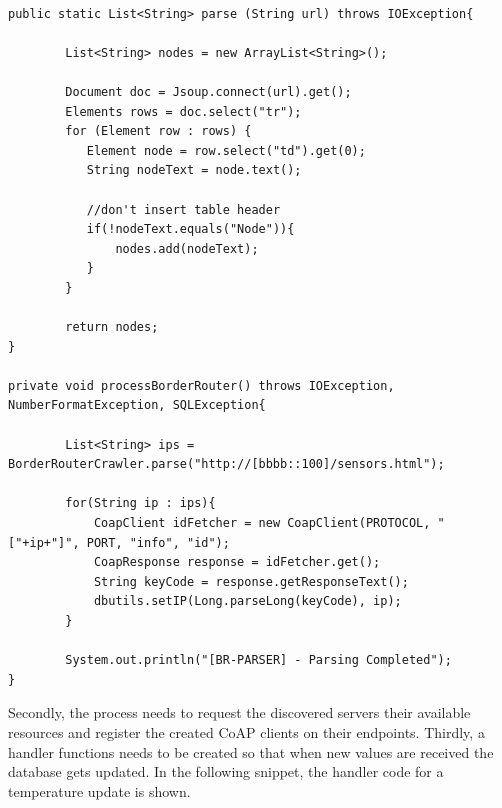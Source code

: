 \begin{lstlisting}[caption={CoAP Client Device Discovery}]

public static List<String> parse (String url) throws IOException{
		
		List<String> nodes = new ArrayList<String>();
		
		Document doc = Jsoup.connect(url).get();
		Elements rows = doc.select("tr");
		for (Element row : rows) {
		   Element node = row.select("td").get(0);
		   String nodeText = node.text();
		   
		   //don't insert table header
		   if(!nodeText.equals("Node")){
			   nodes.add(nodeText);
		   }
		}
		
		return nodes;
}

private void processBorderRouter() throws IOException, NumberFormatException, SQLException{

		List<String> ips = BorderRouterCrawler.parse("http://[bbbb::100]/sensors.html");
		
		for(String ip : ips){
			CoapClient idFetcher = new CoapClient(PROTOCOL, "["+ip+"]", PORT, "info", "id");
			CoapResponse response = idFetcher.get();
			String keyCode = response.getResponseText();
			dbutils.setIP(Long.parseLong(keyCode), ip);
		}
		
		System.out.println("[BR-PARSER] - Parsing Completed");
}

\end{lstlisting}

Secondly, the process needs to request the discovered servers their available resources and register the created \gls{CoAP} clients on their endpoints. Thirdly, a handler functions needs to be created so that when new values are received the database gets updated. In the following snippet, the handler code for a temperature update is shown. 

